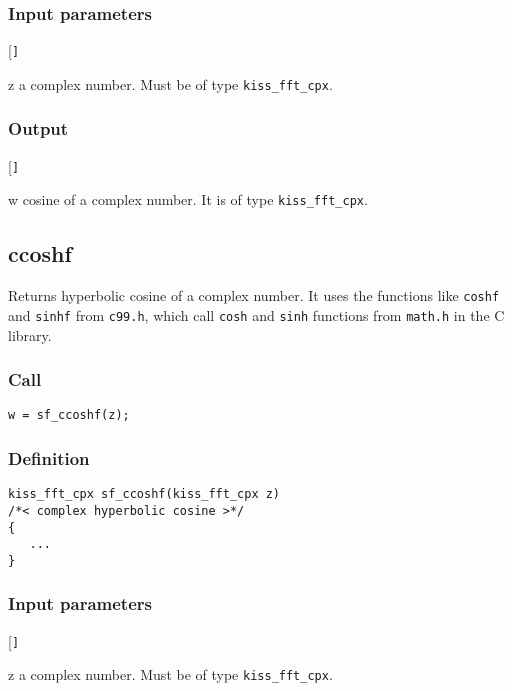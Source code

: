 \subsubsection*{Input parameters}
\begin{desclist}{\tt }{\quad}[\tt ]
   \setlength\itemsep{0pt}
   \item[z] a complex number. Must be of type \texttt{kiss\_fft\_cpx}.
\end{desclist}

\subsubsection*{Output}
\begin{desclist}{\tt }{\quad}[\tt ]
   \setlength\itemsep{0pt}
   \item[w] cosine of a complex number. It is of type \texttt{kiss\_fft\_cpx}.
\end{desclist}




\subsection{{ccoshf}}
Returns hyperbolic cosine of a complex number. It uses the functions like \texttt{coshf} and \texttt{sinhf} from \texttt{c99.h}, which call \texttt{cosh} and \texttt{sinh} functions from \texttt{math.h} in the C library.

\subsubsection*{Call}
\begin{verbatim}w = sf_ccoshf(z);\end{verbatim}

\subsubsection*{Definition}
\begin{verbatim}
kiss_fft_cpx sf_ccoshf(kiss_fft_cpx z)
/*< complex hyperbolic cosine >*/
{
   ...    
}
\end{verbatim}

\subsubsection*{Input parameters}
\begin{desclist}{\tt }{\quad}[\tt ]
   \setlength\itemsep{0pt}
   \item[z] a complex number. Must be of type \texttt{kiss\_fft\_cpx}.
\end{desclist}

